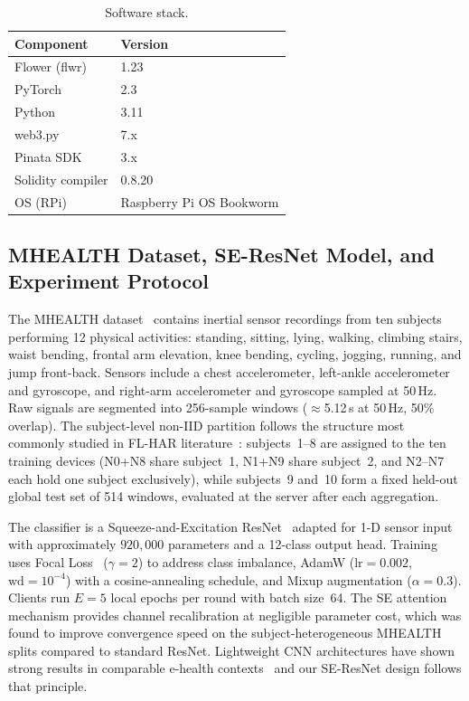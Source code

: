\documentclass{llncs}
\begin{document}
\begin{table}[h]
\caption{Software stack.}
\label{tab:sw}
\centering\footnotesize
\begin{tabular}{ll}
\toprule
\textbf{Component} & \textbf{Version} \\
\midrule
Flower (flwr)        & 1.23 \\
PyTorch              & 2.3 \\
Python               & 3.11 \\
web3.py              & 7.x \\
Pinata SDK           & 3.x \\
Solidity compiler    & 0.8.20 \\
OS (RPi)             & Raspberry Pi OS Bookworm \\
\bottomrule
\end{tabular}
\end{table}

\subsection{MHEALTH Dataset, SE-ResNet Model, and Experiment Protocol}

The MHEALTH dataset~\cite{banos2014mhealth} contains inertial sensor
recordings from ten subjects performing 12 physical activities: standing,
sitting, lying, walking, climbing stairs, waist bending, frontal arm
elevation, knee bending, cycling, jogging, running, and jump front-back.
Sensors include a chest accelerometer, left-ankle accelerometer and
gyroscope, and right-arm accelerometer and gyroscope sampled at 50\,Hz.
Raw signals are segmented into 256-sample windows ($\approx$5.12\,s at 50\,Hz, 50\% overlap). The
subject-level non-IID partition follows the structure most commonly studied
in FL-HAR literature~\cite{aouedi2024harsurvey,shiri2025dlharsurvey}:
subjects~1--8 are assigned to the ten training devices (N0+N8 share subject~1,
N1+N9 share subject~2, and N2--N7 each hold one subject exclusively), while
subjects~9 and~10 form a fixed held-out global test set of 514 windows,
evaluated at the server after each aggregation.

The classifier is a Squeeze-and-Excitation ResNet~\cite{hu2018senet} adapted
for 1-D sensor input with approximately $920{,}000$ parameters and a
12-class output head. Training uses Focal Loss~\cite{lin2017focal}
($\gamma=2$) to address class imbalance, AdamW ($\text{lr}=0.002$,
$\text{wd}=10^{-4}$) with a cosine-annealing schedule, and Mixup augmentation
($\alpha=0.3$). Clients run $E=5$ local epochs per round with batch size~64.
The SE attention mechanism provides channel recalibration at negligible
parameter cost, which was found to improve convergence speed on the
subject-heterogeneous MHEALTH splits compared to standard ResNet.
Lightweight CNN architectures have shown strong results in comparable
e-health contexts~\cite{baltabay2023lightweight,yatbaz2021activity} and our
SE-ResNet design follows that principle.
\end{document}
